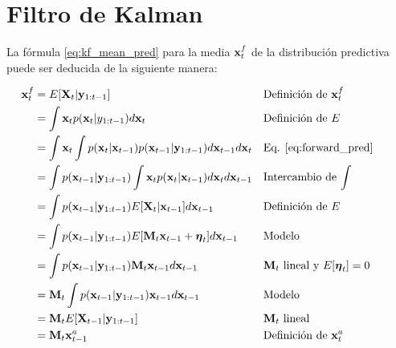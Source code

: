 \section{Filtro de Kalman}\label{appendix:kf}

La fórmula \ref{eq:kf_mean_pred} para la media $\mathbf{x}_t^f$ de la distribución predictiva puede ser deducida de la siguiente manera:

\begin{align*}
    \mathbf{x}_t^f &= E[\mathbf{X}_t | \mathbf{y}_{1:t-1}] && \text{Definición de $\mathbf{x}_t^f$} \\
    &= \int \mathbf{x}_t p(\mathbf{x}_t | y_{1:t-1}) d\mathbf{x}_t && \text{Definición de $E$} \\
    &= \int \mathbf{x}_t \int p(\mathbf{x}_t | \mathbf{x}_{t-1}) p(\mathbf{x}_{t-1} | \mathbf{y}_{1:t-1}) d\mathbf{x}_{t-1} d\mathbf{x}_t && \text{Eq. \ref{eq:forward_pred}} \\
    &= \int p(\mathbf{x}_{t-1} | \mathbf{y}_{1:t-1}) \int \mathbf{x}_t p(\mathbf{x}_t | \mathbf{x}_{t-1}) d\mathbf{x}_t d\mathbf{x}_{t-1} && \text{Intercambio de $\int$}\\ 
    &= \int p(\mathbf{x}_{t-1} | \mathbf{y}_{1:t-1}) E[\mathbf{X}_t | \mathbf{x}_{t-1}] d\mathbf{x}_{t-1} && \text{Definición de $E$}\\
    &= \int p(\mathbf{x}_{t-1} | \mathbf{y}_{1:t-1}) E[\mathbf{M}_t \mathbf{x}_{t-1} + \mbox{\boldmath$ \eta $}_t] d\mathbf{x}_{t-1} && \text{Modelo}\\
    &= \int p(\mathbf{x}_{t-1} | \mathbf{y}_{1:t-1}) \mathbf{M}_t \mathbf{x}_{t-1} d\mathbf{x}_{t-1} && \text{$\mathbf{M}_t$ lineal y $E[\mbox{\boldmath$ \eta $}_t] = 0$}\\
    &= \mathbf{M}_t \int p(\mathbf{x}_{t-1} | \mathbf{y}_{1:t-1}) \mathbf{x}_{t-1} d\mathbf{x}_{t-1} && \text{Modelo} \\
    &= \mathbf{M}_t E[\mathbf{X}_{t-1} | \mathbf{y}_{1:t-1}] && \text{$\mathbf{M}_t$ lineal}\\
    &= \mathbf{M}_t \mathbf{x}_{t-1}^a && \text{Definición de $\mathbf{x}_t^a$} &&
\end{align*}

